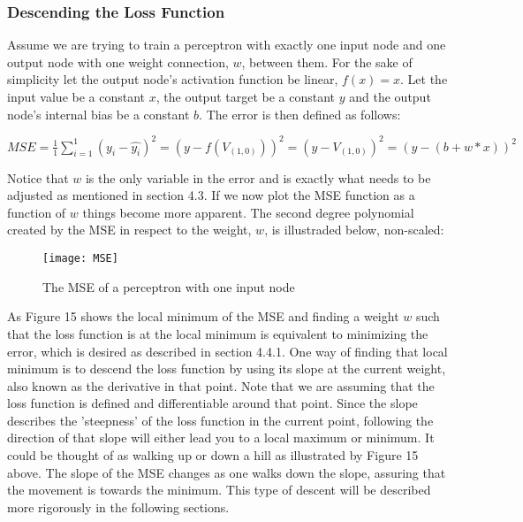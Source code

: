 \documentclass[titlepage]{article}
\begin{document}
\newpage

\subsubsection{Descending the Loss Function}

\vskip 0.2cm

Assume we are trying to train a perceptron with exactly one input node and one output node with one weight connection, $w$, between them. For the sake of simplicity let the output node's activation function be linear, $f(x) = x$. Let the input value be a constant $x$, the output target be a constant $y$ and the output node's internal bias be a constant $b$. The error is then defined as follows: 

\vskip 0.5cm

\centerline{$MSE = \frac{1}{1}\sum_{i=1}^{1}(y_{i} - \hat{y_{i}})^2 = (y - f(V_{(1, 0)}))^2 = (y - V_{(1, 0)})^2 = (y - (b + w * x))^2$}

\vskip 0.5cm

\noindent
Notice that $w$ is the only variable in the error and is exactly what needs to be adjusted as mentioned in section 4.3. If we now plot the MSE function as a function of $w$ things become more apparent. The second degree polynomial created by the MSE in respect to the weight, $w$, is illustraded below, non-scaled:

\vskip 0.5cm

\begin{figure}[h]
    \center
    \texttt{[image: MSE]}
    \caption{The MSE of a perceptron with one input node}
\end{figure}

\vskip 0.2cm

\noindent
As Figure 15 shows the local minimum of the MSE and finding a weight $w$ such that the loss function is at the local minimum is equivalent to minimizing the error, which is desired as described in section 4.4.1. One way of finding that local minimum is to descend the loss function by using its slope at the current weight, also known as the derivative in that point. Note that we are assuming that the loss function is defined and differentiable around that point. Since the slope describes the 'steepness' of the loss function in the current point, following the direction of that slope will either lead you to a local maximum or minimum. It could be thought of as walking up or down a hill as illustrated by Figure 15 above. The slope of the MSE changes as one walks down the slope, assuring that the movement is towards the minimum. This type of descent will be described more rigorously in the following sections.
\end{document}

